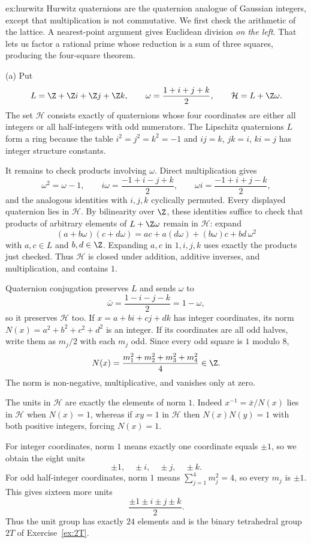 \begin{solution}{ex:hurwitz}
\idea Hurwitz quaternions are the quaternion analogue of Gaussian integers, except that multiplication is not commutative. We first check the arithmetic of the lattice. A nearest-point argument gives Euclidean division \emph{on the left}. That lets us factor a rational prime whose reduction is a sum of three squares, producing the four-square theorem.

\writeup (a) Put
\[
L=\Z+\Z i+\Z j+\Z k,\qquad
\omega=\frac{1+i+j+k}{2},\qquad
\mathcal H=L+\Z\omega.
\]
The set $\mathcal H$ consists exactly of quaternions whose four coordinates are either all integers or all half-integers with odd numerators. The Lipschitz quaternions $L$ form a ring because the table $i^2=j^2=k^2=-1$ and $ij=k$, $jk=i$, $ki=j$ has integer structure constants.

It remains to check products involving $\omega$. Direct multiplication gives
\[
\omega^2=\omega-1,\qquad
i\omega=\frac{-1+i-j+k}{2},\qquad
\omega i=\frac{-1+i+j-k}{2},
\]
and the analogous identities with $i,j,k$ cyclically permuted. Every displayed quaternion lies in $\mathcal H$. By bilinearity over $\Z$, these identities suffice to check that products of arbitrary elements of $L+\Z\omega$ remain in $\mathcal H$: expand
\[
(a+b\omega)(c+d\omega)
=ac+a(d\omega)+(b\omega)c+bd\,\omega^2
\]
with $a,c\in L$ and $b,d\in\Z$. Expanding $a,c$ in $1,i,j,k$ uses exactly the products just checked. Thus $\mathcal H$ is closed under addition, additive inverses, and multiplication, and contains $1$.

Quaternion conjugation preserves $L$ and sends $\omega$ to
\[
\bar\omega=\frac{1-i-j-k}{2}=1-\omega,
\]
so it preserves $\mathcal H$ too. If $x=a+bi+cj+dk$ has integer coordinates, its norm $N(x)=a^2+b^2+c^2+d^2$ is an integer. If its coordinates are all odd halves, write them as $m_j/2$ with each $m_j$ odd. Since every odd square is $1$ modulo $8$,
\[
N(x)=\frac{m_1^2+m_2^2+m_3^2+m_4^2}{4}\in\Z.
\]
The norm is non-negative, multiplicative, and vanishes only at zero.

The units in $\mathcal H$ are exactly the elements of norm $1$. Indeed $x^{-1}=\bar x/N(x)$ lies in $\mathcal H$ when $N(x)=1$, whereas if $xy=1$ in $\mathcal H$ then $N(x)N(y)=1$ with both positive integers, forcing $N(x)=1$.

For integer coordinates, norm $1$ means exactly one coordinate equals $\pm1$, so we obtain the eight units
\[
\pm1,\quad\pm i,\quad\pm j,\quad\pm k.
\]
For odd half-integer coordinates, norm $1$ means $\sum_{j=1}^4m_j^2=4$, so every $m_j$ is $\pm1$. This gives sixteen more units
\[
\frac{\pm1\pm i\pm j\pm k}{2}.
\]
Thus the unit group has exactly $24$ elements and is the binary tetrahedral group $2T$ of Exercise~\ref{ex:2T}.


\end{solution}

